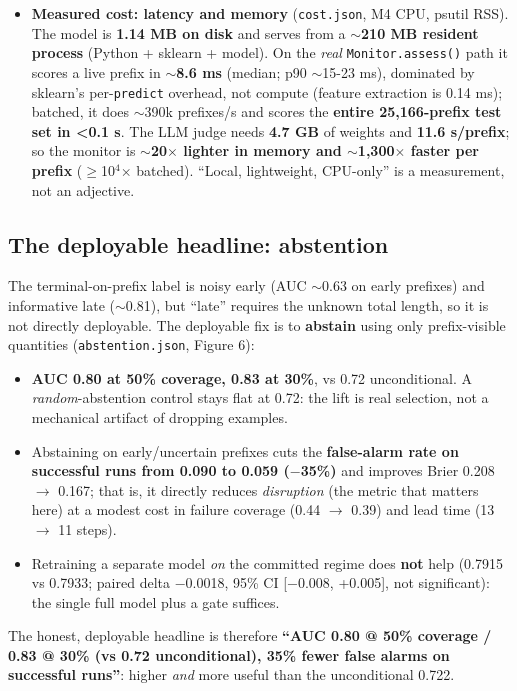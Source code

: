 \begin{itemize}
\item \textbf{Measured cost: latency and memory} (\texttt{cost.json}, M4 CPU, psutil RSS). The model is \textbf{1.14 MB on disk} and serves from a \textbf{$\sim$210 MB resident process} (Python + sklearn + model). On the \emph{real} \texttt{Monitor.assess()} path it scores a live prefix in \textbf{$\sim$8.6 ms} (median; p90 $\sim$15-23 ms), dominated by sklearn's per-\texttt{predict} overhead, not compute (feature extraction is 0.14 ms); batched, it does $\sim$390k prefixes/s and scores the \textbf{entire 25,166-prefix test set in <0.1 s}. The LLM judge needs \textbf{4.7 GB} of weights and \textbf{11.6 s/prefix}; so the monitor is \textbf{$\sim$20$\times$ lighter in memory and $\sim$1,300$\times$ faster per prefix} ($\ge$10$^4$$\times$ batched). ``Local, lightweight, CPU-only'' is a measurement, not an adjective.
\end{itemize}
\subsection{The deployable headline: abstention}
The terminal-on-prefix label is noisy early (AUC $\sim$0.63 on early prefixes) and informative late ($\sim$0.81), but ``late'' requires the unknown total length, so it is not directly deployable. The deployable fix is to \textbf{abstain} using only prefix-visible quantities (\texttt{abstention.json}, Figure 6):

\begin{itemize}
\item \textbf{AUC 0.80 at 50\% coverage, 0.83 at 30\%}, vs 0.72 unconditional. A \emph{random}-abstention control stays flat at 0.72: the lift is real selection, not a mechanical artifact of dropping examples.
\item Abstaining on early/uncertain prefixes cuts the \textbf{false-alarm rate on successful runs from 0.090 to 0.059 ($-$35\%)} and improves Brier 0.208 $\to$ 0.167; that is, it directly reduces \emph{disruption} (the metric that matters here) at a modest cost in failure coverage (0.44 $\to$ 0.39) and lead time (13 $\to$ 11 steps).
\item Retraining a separate model \emph{on} the committed regime does \textbf{not} help (0.7915 vs 0.7933; paired delta $-$0.0018, 95\% CI [$-$0.008, +0.005], not significant): the single full model plus a gate suffices.
\end{itemize}
The honest, deployable headline is therefore \textbf{``AUC 0.80 @ 50\% coverage / 0.83 @ 30\% (vs 0.72 unconditional), 35\% fewer false alarms on successful runs''}: higher \emph{and} more useful than the unconditional 0.722.

